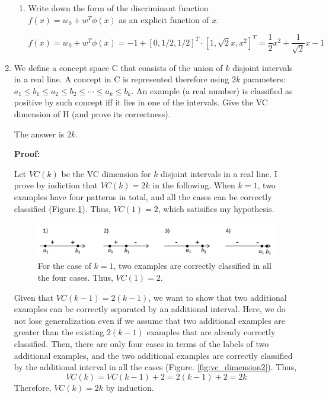 \begin{enumerate}
\begin{enumerate}
\item Write down the form of the discriminant function $f(x)=w_0+w^T\phi(x)$ as an explicit function of $x$.

\[
f(x)=w_0 + w^T \phi(x)=-1 + [0, 1/2, 1/2]^T \cdot [1, \sqrt{2}x, x^2]^T=\frac{1}{2}x^2+\frac{1}{\sqrt{2}}x-1
\]

\end{enumerate}

\item We define a concept space C that consists of the union of $k$ disjoint intervals in a real line. A concept in C is represented therefore using $2k$ parameters: $a_1 \le b_1 \le a_2 \le b_2 \le \cdots \le a_k \le b_k$. An example (a real number) is classified as positive by such concept iff it lies in one of the intervals. Give the VC dimension of H (and prove its correctness).

The answer is $2k$.

{\bf Proof:}

Let $VC(k)$ be the VC dimension for $k$ disjoint intervals in a real line. I prove by indiction that $VC(k)=2k$ in the following. When $k=1$, two examples have four patterns in total, and all the cases can be correctly classified (Figure.\ref{fig:vc_dimension1}). Thus, $VC(1)=2$, which satisifies my hypothesis. 

\begin{figure}[hbtp]
\centering
\includegraphics[width=150mm]{vc_dimension1.jpg}
\caption{For the case of $k=1$, two examples are correctly classified in all the four cases. Thus, $VC(1)=2$.}
\label{fig:vc_dimension1}
\end{figure}

Given that $VC(k-1)=2(k-1)$, we want to show that two additional examples can be correctly separated by an additional interval. Here, we do not lose generalization even if we assume that two additional examples are greater than the existing $2(k-1)$ examples that are already correctly classified. Then, there are only four cases in terms of the labels of two additional examples, and the two additional examples are correctly classified by the additional interval in all the cases (Figure. \ref{fig:vc_dimension2}). Thus, 
\[
VC(k)=VC(k-1)+2=2(k-1)+2=2k
\]
Therefore, $VC(k)=2k$ by induction.


\end{enumerate}
